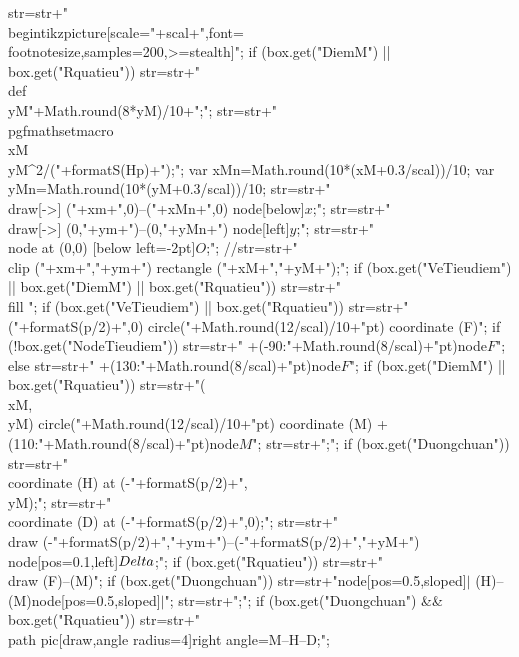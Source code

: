 {{{			str=str+"\\begin{tikzpicture}[scale="+scal+",font=\\footnotesize,samples=200,>=stealth]";
			if (box.get("DiemM") || box.get("Rquatieu")) {
				str=str+"\n\\def\\yM{"+Math.round(8*yM)/10+"};";
				str=str+"\n\\pgfmathsetmacro{\\xM}{\\yM^2/("+formatS(Hp)+")};";
			}
			var xMn=Math.round(10*(xM+0.3/scal))/10;
			var yMn=Math.round(10*(yM+0.3/scal))/10;
			str=str+"\n\\draw[->] ("+xm+",0)--("+xMn+",0) node[below]{$x$};";
			str=str+"\n\\draw[->] (0,"+ym+")--(0,"+yMn+") node[left]{$y$};";
			str=str+"\n\\node at (0,0) [below left=-2pt]{$O$};";
			//str=str+"\n\\clip ("+xm+","+ym+") rectangle ("+xM+","+yM+");";
			if (box.get("VeTieudiem") || box.get("DiemM") || box.get("Rquatieu")) {
				str=str+"\n\\fill ";
				if (box.get("VeTieudiem") || box.get("Rquatieu"))
				str=str+"("+formatS(p/2)+",0) circle("+Math.round(12/scal)/10+"pt) coordinate (F)";
				if (!box.get("NodeTieudiem"))
				str=str+" +(-90:"+Math.round(8/scal)+"pt)node{$F$}";
				else
				str=str+" +(130:"+Math.round(8/scal)+"pt)node{$F$}";
				if (box.get("DiemM") || box.get("Rquatieu"))
				str=str+"\n(\\xM,\\yM) circle("+Math.round(12/scal)/10+"pt) coordinate (M) +(110:"+Math.round(8/scal)+"pt)node{$M$}";
				str=str+";";
			}
			if (box.get("Duongchuan")) {
				str=str+"\n\\coordinate (H) at (-"+formatS(p/2)+",\\yM);";
				str=str+"\n\\coordinate (D) at (-"+formatS(p/2)+",0);";
				str=str+"\n\\draw (-"+formatS(p/2)+","+ym+")--(-"+formatS(p/2)+","+yM+") node[pos=0.1,left]{$\\Delta$};";
			}
			if (box.get("Rquatieu")) {
				str=str+"\n\\draw (F)--(M)";
				if (box.get("Duongchuan"))
				str=str+"node[pos=0.5,sloped]{$|$} \n(H)--(M)node[pos=0.5,sloped]{$|$}";
				str=str+";";
			}
			if (box.get("Duongchuan") && box.get("Rquatieu"))
			str=str+"\n\\path pic[draw,angle radius=4]{right angle=M--H--D};";
}}}
